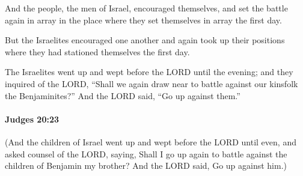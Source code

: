 			\begin{versebox}
					\item[BHS] 
					\item[ASV] And the people, the men of Israel, encouraged themselves, and set the battle again in array in the place where they set themselves in array the first day.
					\item[NIV] But the Israelites encouraged one another and again took up their positions where they had stationed themselves the first day.
					\item[NRSV] The Israelites went up and wept before the LORD until the evening; and they inquired of the LORD, “Shall we again draw near to battle against our kinsfolk the Benjaminites?” And the LORD said, “Go up against them.”
			\end{versebox}

		\paragraph{Judges 20:23} %
			\label{JUDGES-20-23}

			(And the children of Israel went up and wept before the LORD until even, and asked counsel of the LORD, saying, Shall I go up again to battle against the children of Benjamin my brother? And the LORD said, Go up against him.)

